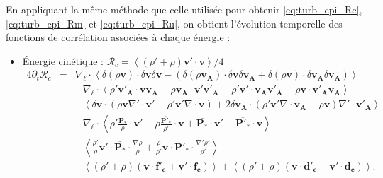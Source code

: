 En appliquant la  même méthode que celle utilisée pour obtenir \eqref{eq:turb_cpi_Rc}, \eqref{eq:turb_cpi_Rm} et \eqref{eq:turb_cpi_Ru}, on obtient l'évolution temporelle des fonctions de corrélation associées à chaque énergie : 
\begin{itemize}
    \item Énergie cinétique : $\mathcal{R}_{c} = \left<\left(\rho'+\rho\right)\boldsymbol{v'} \cdot \boldsymbol{v}\right>/4 $
\begin{eqnarray}
\label{eq:turb_cpg_Rc} 4\partial_t \mathcal{R}_{c} &=& \nabla_{\boldsymbol{\ell}} \cdot \left<\delta \left(\rho\boldsymbol{v}\right) \cdot \delta \boldsymbol{v} \delta \boldsymbol{v} -\left(\delta \left(\rho\boldsymbol{v_A}\right) \cdot \delta \boldsymbol{v} \delta \boldsymbol{v_A} + \delta \left(\rho\boldsymbol{v}\right) \cdot \delta \boldsymbol{v_A} \delta \boldsymbol{v_A} \right)\right>\nonumber \\
&&+ \nabla_{\boldsymbol{\ell}} \cdot \left<\rho' \boldsymbol{v'_A}\cdot  \boldsymbol{v} \boldsymbol{v_A} -\rho \boldsymbol{v_A}\cdot  \boldsymbol{v'} \boldsymbol{v'_A}-\rho' \boldsymbol{v'} \cdot\boldsymbol{v_A}\boldsymbol{v'_A} +  \rho  \boldsymbol{v} \cdot\boldsymbol{v'_A}\boldsymbol{v_A}\right> \nonumber\\
& &+\left<\delta \boldsymbol{v}\cdot \left( \rho \boldsymbol{v}  \nabla' \cdot \boldsymbol{v'} -\rho' \boldsymbol{v'} \nabla \cdot \boldsymbol{v} \right)+2 \delta \boldsymbol{v_A}\cdot \left( \rho' \boldsymbol{v'} \nabla \cdot \boldsymbol{v_A} - \rho \boldsymbol{v} \right) \nabla' \cdot \boldsymbol{v'_A}\right> \nonumber\\
&&+  \nabla_{\boldsymbol{\ell}} \cdot \left< \rho' \frac{ \overline{\boldsymbol{P_*}}}{\rho} \cdot \boldsymbol{v'} -  \rho \frac{\overline{\boldsymbol{P'_*}}}{\rho'} \cdot \boldsymbol{v} + \overline{\boldsymbol{P_*}} \cdot \boldsymbol{v'} -  \overline{\boldsymbol{P'_*}} \cdot \boldsymbol{v} \right>\nonumber \\
&&- \left<\frac{\rho'}{\rho} \boldsymbol{v'} \cdot \overline{\boldsymbol{P_*}}  \cdot \frac{\nabla \rho}{\rho} + \frac{\rho}{\rho'} \boldsymbol{v} \cdot \overline{\boldsymbol{P'_*}}   \cdot \frac{\nabla' \rho'}{\rho'} \right>\nonumber\\
&&+  \left<\left(\rho' + \rho\right)\left(\boldsymbol{v} \cdot \boldsymbol{f'_c} + \boldsymbol{v'} \cdot \boldsymbol{f_c}\right) \right>+ \left<\left(\rho' + \rho\right)\left(\boldsymbol{v} \cdot \boldsymbol{d'_c} + \boldsymbol{v'} \cdot \boldsymbol{d_c}\right)\right> .
\end{eqnarray}

\end{itemize}
